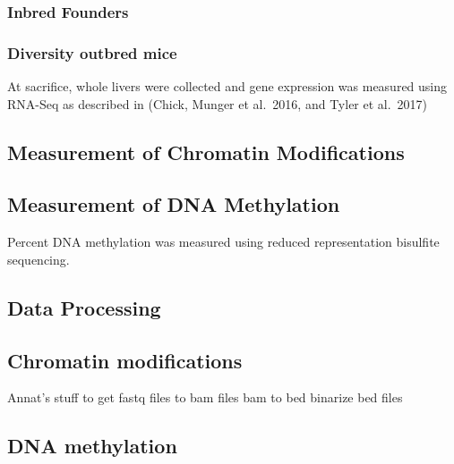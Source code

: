 \documentclass[10pt,letterpaper]{article}
\begin{document}
\hypertarget{inbred-founders}{%
\subsubsection{Inbred Founders}\label{inbred-founders}}

\hypertarget{diversity-outbred-mice-2}{%
\subsubsection{Diversity outbred mice}\label{diversity-outbred-mice-2}}

At sacrifice, whole livers were collected and gene expression was
measured using RNA-Seq as described in (Chick, Munger et al.~2016, and
Tyler et al.~2017)

\hypertarget{measurement-of-chromatin-modifications}{%
\subsection{Measurement of Chromatin
Modifications}\label{measurement-of-chromatin-modifications}}

\hypertarget{measurement-of-dna-methylation}{%
\subsection{Measurement of DNA
Methylation}\label{measurement-of-dna-methylation}}

Percent DNA methylation was measured using reduced representation
bisulfite sequencing.

\hypertarget{data-processing}{%
\subsection{Data Processing}\label{data-processing}}

\hypertarget{chromatin-modifications}{%
\subsection{Chromatin modifications}\label{chromatin-modifications}}

Annat's stuff to get fastq files to bam files bam to bed binarize bed
files

\hypertarget{dna-methylation}{%
\subsection{DNA methylation}\label{dna-methylation}}
\end{document}
